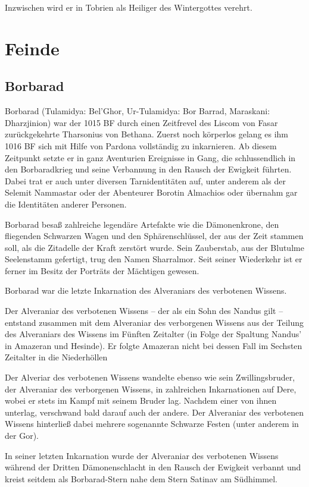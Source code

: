 Inzwischen wird er in Tobrien als Heiliger des Wintergottes verehrt.

\section{Feinde}
\subsection{Borbarad}
Borbarad (Tulamidya: Bel'Ghor, Ur-Tulamidya: Bor Barrad, Maraskani: Dharzjinion) war der 1015 BF durch einen Zeitfrevel des Liscom von Fasar zurückgekehrte Tharsonius von Bethana. Zuerst noch körperlos gelang es ihm 1016 BF sich mit Hilfe von Pardona vollständig zu inkarnieren. Ab diesem Zeitpunkt setzte er in ganz Aventurien Ereignisse in Gang, die schlussendlich in den Borbaradkrieg und seine Verbannung in den Rausch der Ewigkeit führten. Dabei trat er auch unter diversen Tarnidentitäten auf, unter anderem als der Selemit Nammastar oder der Abenteurer Borotin Almachios oder übernahm gar die Identitäten anderer Personen.

Borbarad besaß zahlreiche legendäre Artefakte wie die Dämonenkrone, den fliegenden Schwarzen Wagen und den Sphärenschlüssel, der aus der Zeit stammen soll, als die Zitadelle der Kraft zerstört wurde. Sein Zauberstab, aus der Blutulme Seelenstamm gefertigt, trug den Namen Sharralmor. Seit seiner Wiederkehr ist er ferner im Besitz der Porträts der Mächtigen gewesen.

Borbarad war die letzte Inkarnation des Alveraniars des verbotenen Wissens.

Der Alveraniar des verbotenen Wissens – der als ein Sohn des Nandus gilt – entstand zusammen mit dem Alveraniar des verborgenen Wissens aus der Teilung des Alveraniars des Wissens im Fünften Zeitalter (in Folge der Spaltung Nandus' in Amazeran und Hesinde). Er folgte Amazeran nicht bei dessen Fall im Sechsten Zeitalter in die Niederhöllen

Der Alveriar des verbotenen Wissens wandelte ebenso wie sein Zwillingsbruder, der Alveraniar des verborgenen Wissens, in zahlreichen Inkarnationen auf Dere, wobei er stets im Kampf mit seinem Bruder lag. Nachdem einer von ihnen unterlag, verschwand bald darauf auch der andere. Der Alveraniar des verbotenen Wissens hinterließ dabei mehrere sogenannte Schwarze Festen (unter anderem in der Gor).

In seiner letzten Inkarnation wurde der Alveraniar des verbotenen Wissens während der Dritten Dämonenschlacht in den Rausch der Ewigkeit verbannt und kreist seitdem als Borbarad-Stern nahe dem Stern Satinav am Südhimmel. 


